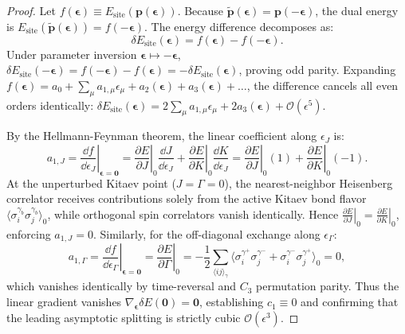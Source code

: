 \begin{proof}
Let $f(\boldsymbol{\epsilon}) \equiv E_{\mathrm{site}}(\mathbf{p}(\boldsymbol{\epsilon}))$. Because $\tilde{\mathbf{p}}(\boldsymbol{\epsilon}) = \mathbf{p}(-\boldsymbol{\epsilon})$, the dual energy is $E_{\mathrm{site}}(\tilde{\mathbf{p}}(\boldsymbol{\epsilon})) = f(-\boldsymbol{\epsilon})$.
The energy difference decomposes as:
\begin{equation}
\delta E_{\mathrm{site}}(\boldsymbol{\epsilon}) = f(\boldsymbol{\epsilon}) - f(-\boldsymbol{\epsilon}).
\end{equation}
Under parameter inversion $\boldsymbol{\epsilon} \mapsto -\boldsymbol{\epsilon}$, $\delta E_{\mathrm{site}}(-\boldsymbol{\epsilon}) = f(-\boldsymbol{\epsilon}) - f(\boldsymbol{\epsilon}) = -\delta E_{\mathrm{site}}(\boldsymbol{\epsilon})$, proving odd parity.
Expanding $f(\boldsymbol{\epsilon}) = a_0 + \sum_\mu a_{1,\mu} \epsilon_\mu + a_2(\boldsymbol{\epsilon}) + a_3(\boldsymbol{\epsilon}) + \dots$, the difference cancels all even orders identically: $\delta E_{\mathrm{site}}(\boldsymbol{\epsilon}) = 2 \sum_\mu a_{1,\mu} \epsilon_\mu + 2 a_3(\boldsymbol{\epsilon}) + \mathcal{O}(\epsilon^5)$.

By the Hellmann-Feynman theorem, the linear coefficient along $\epsilon_J$ is:
\begin{equation}
a_{1, J} = \left. \frac{\dd f}{\dd \epsilon_J} \right|_{\boldsymbol{\epsilon}=\mathbf{0}} = \left. \frac{\partial E}{\partial J} \right|_0 \frac{\dd J}{\dd \epsilon_J} + \left. \frac{\partial E}{\partial K} \right|_0 \frac{\dd K}{\dd \epsilon_J} = \left. \frac{\partial E}{\partial J} \right|_0 (1) + \left. \frac{\partial E}{\partial K} \right|_0 (-1).
\end{equation}
At the unperturbed Kitaev point ($J = \Gamma = 0$), the nearest-neighbor Heisenberg correlator receives contributions solely from the active Kitaev bond flavor $\langle \sigma_i^{\gamma_b} \sigma_j^{\gamma_b} \rangle_0$, while orthogonal spin correlators vanish identically. Hence $\left. \frac{\partial E}{\partial J} \right|_0 = \left. \frac{\partial E}{\partial K} \right|_0$, enforcing $a_{1, J} = 0$.
Similarly, for the off-diagonal exchange along $\epsilon_\Gamma$:
\begin{equation}
a_{1, \Gamma} = \left. \frac{\dd f}{\dd \epsilon_\Gamma} \right|_{\boldsymbol{\epsilon}=\mathbf{0}} = \left. \frac{\partial E}{\partial \Gamma} \right|_0 = -\frac{1}{2} \sum_{\langle ij \rangle_\gamma} \langle \sigma_i^{\gamma^+} \sigma_j^{\gamma^-} + \sigma_i^{\gamma^-} \sigma_j^{\gamma^+} \rangle_0 = 0,
\end{equation}
which vanishes identically by time-reversal and $C_3$ permutation parity.
Thus the linear gradient vanishes $\nabla_{\boldsymbol{\epsilon}} \delta E(\mathbf{0}) = \mathbf{0}$, establishing $c_1 \equiv 0$ and confirming that the leading asymptotic splitting is strictly cubic $\mathcal{O}(\epsilon^3)$.
\end{proof}

